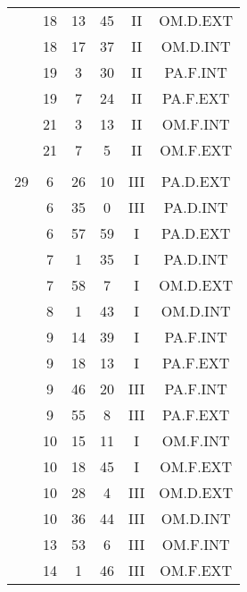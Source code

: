 \documentclass[12pt, a4paper]{article}
\begin{document}
\begin{multicols}{3}
{\begin{tabular}{c c c c c c}
	 	 	 	 & 18 & 13 & 45 & II & OM.D.EXT\\%
	 	 	 	 & 18 & 17 & 37 & II & OM.D.INT\\%
	 	 	 	 & 19 & 3 & 30 & II & PA.F.INT\\%
	 	 	 	 & 19 & 7 & 24 & II & PA.F.EXT\\%
	 	 	 	 & 21 & 3 & 13 & II & OM.F.INT\\%
	 	 	 	 & 21 & 7 & 5 & II & OM.F.EXT\\%
	 	 	 	 & & & & & \\%
	 	 	 	29 & 6 & 26 & 10 & III & PA.D.EXT\\%
	 	 	 	 & 6 & 35 & 0 & III & PA.D.INT\\%
	 	 	 	 & 6 & 57 & 59 & I & PA.D.EXT\\%
	 	 	 	 & 7 & 1 & 35 & I & PA.D.INT\\%
	 	 	 	 & 7 & 58 & 7 & I & OM.D.EXT\\%
	 	 	 	 & 8 & 1 & 43 & I & OM.D.INT\\%
	 	 	 	 & 9 & 14 & 39 & I & PA.F.INT\\%
	 	 	 	 & 9 & 18 & 13 & I & PA.F.EXT\\%
	 	 	 	 & 9 & 46 & 20 & III & PA.F.INT\\%
	 	 	 	 & 9 & 55 & 8 & III & PA.F.EXT\\%
	 	 	 	 & 10 & 15 & 11 & I & OM.F.INT\\%
	 	 	 	 & 10 & 18 & 45 & I & OM.F.EXT\\%
	 	 	 	 & 10 & 28 & 4 & III & OM.D.EXT\\%
	 	 	 	 & 10 & 36 & 44 & III & OM.D.INT\\%
	 	 	 	 & 13 & 53 & 6 & III & OM.F.INT\\%
	 	 	 	 & 14 & 1 & 46 & III & OM.F.EXT\\%

\end{tabular}}
\end{multicols}
\end{document}

